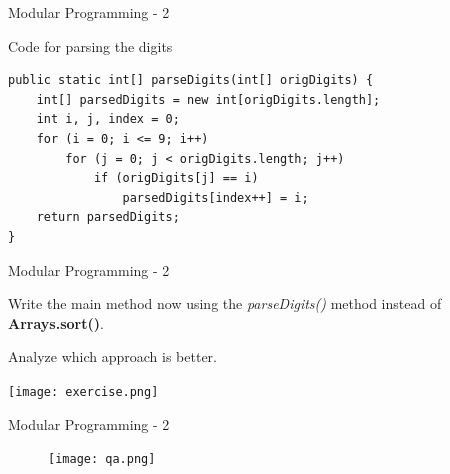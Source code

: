 \documentclass[14pt]{beamer}
\begin{document}
\begin{frame}[fragile]{Modular Programming - 2}
\begin{block}{Code for parsing the digits}
\begin{lstlisting}[numbers=none]
public static int[] parseDigits(int[] origDigits) {
    int[] parsedDigits = new int[origDigits.length];
    int i, j, index = 0;
    for (i = 0; i <= 9; i++)
        for (j = 0; j < origDigits.length; j++)
            if (origDigits[j] == i)            
                parsedDigits[index++] = i;
    return parsedDigits;
}
\end{lstlisting}
\end{block}
\end{frame}

\begin{frame}[fragile]{Modular Programming - 2}
\begin{minipage}{7cm}
Write the main method now using the \emph{parseDigits()} method instead of \textbf{Arrays.sort()}.

Analyze which approach is better. 
\end{minipage}
\quad
\begin{minipage}{3cm}
\texttt{[image: exercise.png]}
\end{minipage}
\end{frame}

\begin{frame}{Modular Programming - 2}
 \begin{figure}[H]
 \begin{center}
   \texttt{[image: qa.png]}   
 \end{center}
  \end{figure}
\end{frame}
\end{document}
